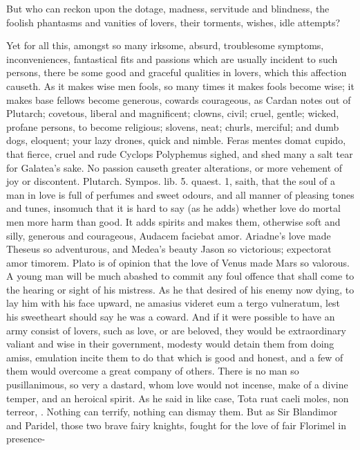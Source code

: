 But who can reckon upon the dotage, madness, servitude and blindness,
the foolish phantasms and vanities of lovers, their torments, wishes,
idle attempts?

Yet for all this, amongst so many irksome, absurd, troublesome
symptoms, inconveniences, fantastical fits and passions which are
usually incident to such persons, there be some good and graceful
qualities in lovers, which this affection causeth. As it makes wise men
fools, so many times it makes fools become wise; it makes base
fellows become generous, cowards courageous, as Cardan notes out of
Plutarch; covetous, liberal and magnificent; clowns, civil; cruel,
gentle; wicked, profane persons, to become religious; slovens, neat;
churls, merciful; and dumb dogs, eloquent; your lazy drones, quick and
nimble. Feras mentes domat cupido, that fierce, cruel and rude Cyclops
Polyphemus sighed, and shed many a salt tear for Galatea's sake. No
passion causeth greater alterations, or more vehement of joy or
discontent. Plutarch. Sympos. lib. 5. quaest. 1,  saith, that the
soul of a man in love is full of perfumes and sweet odours, and all
manner of pleasing tones and tunes, insomuch that it is hard to say (as
he adds) whether love do mortal men more harm than good. It adds
spirits and makes them, otherwise soft and silly, generous and
courageous, Audacem faciebat amor. Ariadne's love made Theseus so
adventurous, and Medea's beauty Jason so victorious; expectorat amor
timorem. Plato is of opinion that the love of Venus made Mars so
valorous. A young man will be much abashed to commit any foul offence
that shall come to the hearing or sight of his mistress. As he
that desired of his enemy now dying, to lay him with his face upward,
ne amasius videret eum a tergo vulneratum, lest his sweetheart should
say he was a coward. And if it were possible to have an army
consist of lovers, such as love, or are beloved, they would be
extraordinary valiant and wise in their government, modesty would
detain them from doing amiss, emulation incite them to do that which is
good and honest, and a few of them would overcome a great company of
others. There is no man so pusillanimous, so very a dastard, whom love
would not incense, make of a divine temper, and an heroical spirit. As
he said in like case,  Tota ruat caeli moles, non terreor, \etc{}.
Nothing can terrify, nothing can dismay them. But as Sir Blandimor and
Paridel, those two brave fairy knights, fought for the love of fair
Florimel in presence-

